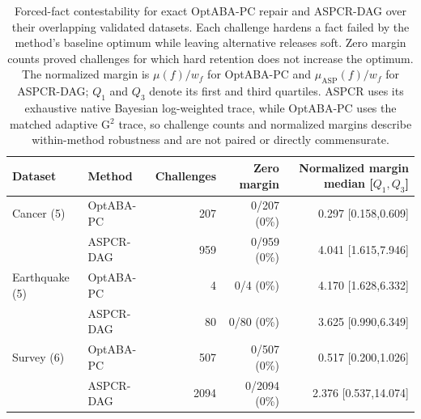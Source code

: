 \begin{table}[t]
\centering
\small
\caption{Forced-fact contestability for exact OptABA-PC repair and ASPCR-DAG over their overlapping validated datasets. Each challenge hardens a fact failed by the method's baseline optimum while leaving alternative releases soft. Zero margin counts proved challenges for which hard retention does not increase the optimum. The normalized margin is $\mu(f)/w_f$ for OptABA-PC and $\mu_{\mathrm{ASP}}(f)/w_f$ for ASPCR-DAG; $Q_1$ and $Q_3$ denote its first and third quartiles. ASPCR uses its exhaustive native Bayesian log-weighted trace, while OptABA-PC uses the matched adaptive G$^2$ trace, so challenge counts and normalized margins describe within-method robustness and are not paired or directly commensurate.}
\label{tab:aspcr-contestability-comparison}
\begin{tabular}{llrrr}
\toprule
Dataset & Method & Challenges & Zero margin & Normalized margin median [$Q_1,Q_3$] \\
\midrule
Cancer (5) & OptABA-PC & 207 & 0/207 (0\%) & 0.297 [0.158,0.609] \\
 & ASPCR-DAG & 959 & 0/959 (0\%) & 4.041 [1.615,7.946] \\
\midrule
Earthquake (5) & OptABA-PC & 4 & 0/4 (0\%) & 4.170 [1.628,6.332] \\
 & ASPCR-DAG & 80 & 0/80 (0\%) & 3.625 [0.990,6.349] \\
\midrule
Survey (6) & OptABA-PC & 507 & 0/507 (0\%) & 0.517 [0.200,1.026] \\
 & ASPCR-DAG & 2094 & 0/2094 (0\%) & 2.376 [0.537,14.074] \\
\bottomrule
\end{tabular}
\end{table}
